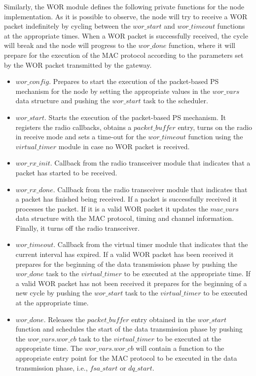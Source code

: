 Similarly, the WOR module defines the following private functions for the node implementation. As it is possible to observe, the node will try to receive a WOR packet indefinitely by cycling between the $wor\_start$ and $wor\_timeout$ functions at the appropriate times. When a WOR packet is successfully received, the cycle will break and the node will progress to the $wor\_done$ function, where it will prepare for the execution of the MAC protocol according to the parameters set by the WOR packet transmitted by the gateway.
\begin{itemize}
\item $wor\_config$. Prepares to start the execution of the packet-based PS mechanism for the node by setting the appropriate values in the $wor\_vars$ data structure and pushing the $wor\_start$ task to the scheduler.
\item $wor\_start$. Starts the execution of the packet-based PS mechanism. It registers the radio callbacks, obtains a $packet\_buffer$ entry, turns on the radio in receive mode and sets a time-out for the $wor\_timeout$ function using the $virtual\_timer$ module in case no WOR packet is received.
\item $wor\_rx\_init$. Callback from the radio transceiver module that indicates that a packet has started to be received.
\item $wor\_rx\_done$. Callback from the radio transceiver module that indicates that a packet has finished being received. If a packet is successfully received it processes the packet. If it is a valid WOR packet it updates the $mac\_vars$ data structure with the MAC protocol, timing and channel information. Finally, it turns off the radio transceiver.
\item $wor\_timeout$. Callback from the virtual timer module that indicates that the current interval has expired. If a valid WOR packet has been received it prepares for the beginning of the data transmission phase by pushing the $wor\_done$ task to the $virtual\_timer$ to be executed at the appropriate time. If a valid WOR packet has not been received it prepares for the beginning of a new cycle by pushing the $wor\_start$ task to the $virtual\_timer$ to be executed at the appropriate time.
\item $wor\_done$. Releases the $packet\_buffer$ entry obtained in the $wor\_start$ function and schedules the start of the data transmission phase by pushing the $wor\_vars.wor\_cb$ task to the $virtual\_timer$ to be executed at the appropriate time. The $wor\_vars.wor\_cb$ will contain a function to the appropriate entry point for the MAC protocol to be executed in the data transmission phase, i.e., $fsa\_start$ or $dq\_start$.
\end{itemize}

